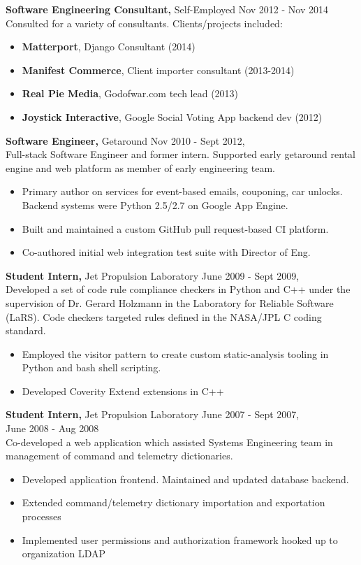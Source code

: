 \documentclass[margin]{res}
\begin{document}
\begin{resume}
  {\bf Software Engineering Consultant,} Self-Employed   \hfill Nov 2012 - Nov 2014\\
  Consulted for a variety of consultants.  Clients/projects included:
  \begin{itemize}
    \item {\bf Matterport}, Django Consultant (2014)
    \item {\bf Manifest Commerce}, Client importer consultant (2013-2014)
    \item {\bf Real Pie Media}, Godofwar.com tech lead (2013)
    \item {\bf Joystick Interactive}, Google Social Voting App backend dev (2012)
  \end{itemize}

  {\bf Software Engineer,} Getaround \hfill Nov 2010 - Sept 2012, \\
  Full-stack Software Engineer and former intern.  Supported early getaround rental engine and web platform as member of early engineering team.
  \begin{itemize}
   \item Primary author on services for event-based emails, couponing, car unlocks.  Backend systems were Python 2.5/2.7 on Google App Engine.
    \item Built and maintained a custom GitHub pull request-based CI platform.
    \item Co-authored initial web integration test suite with Director of Eng.
  \end{itemize}

{\bf Student Intern,} Jet Propulsion Laboratory \hfill June 2009 - Sept 2009, \\
 Developed a set of code rule compliance checkers in Python and C++ under the supervision of Dr. Gerard Holzmann in the Laboratory for Reliable Software (LaRS).  Code checkers targeted rules defined in the NASA/JPL C coding standard.
 \begin{itemize}
 \item Employed the visitor pattern to create custom static-analysis tooling in Python and bash shell scripting.
 \item Developed Coverity Extend extensions in C++
 \end{itemize}

\pagebreak{}

 {\bf Student Intern,} Jet Propulsion Laboratory \hfill June 2007 - Sept 2007, \\
 \makebox[3.27in]{\hfill} June 2008 - Aug 2008 \\ 
 Co-developed a web application which assisted Systems Engineering team in management of command and telemetry dictionaries.
 \begin{itemize}
 \item Developed application frontend. Maintained and updated database backend.
 \item Extended command/telemetry dictionary importation and exportation processes
 \item Implemented user permissions and authorization framework hooked up to organization LDAP
 \end{itemize} 


\end{resume}
\end{document}
